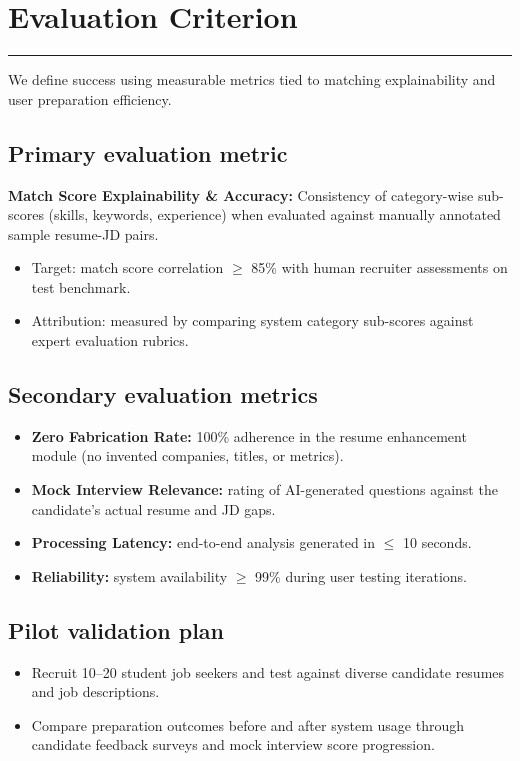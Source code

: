 \documentclass[11pt,a4paper]{article}
\newcommand{\BvrSectionRule}{%
  \par\nobreak\vspace{0.25em}%
  \noindent\rule{\linewidth}{0.4pt}%
  \par\nobreak\vspace{0.4em}%
}
\begin{document}
\section{Evaluation Criterion %
}
\BvrSectionRule
We define success using measurable metrics tied to matching
explainability and user preparation efficiency.

\subsection{Primary evaluation metric}
\textbf{Match Score Explainability \& Accuracy:} Consistency
of category-wise sub-scores (skills, keywords, experience)
when evaluated against manually annotated sample resume-JD
pairs.
\begin{itemize}[leftmargin=0.7cm]
    \item Target: match score correlation $\ge$ 85\% with human recruiter assessments on test benchmark.
    \item Attribution: measured by comparing system category sub-scores against expert evaluation rubrics.
\end{itemize}

\subsection{Secondary evaluation metrics}
\begin{itemize}[leftmargin=0.7cm]
    \item \textbf{Zero Fabrication Rate:} 100\% adherence in the resume enhancement module (no invented companies, titles, or metrics).
    \item \textbf{Mock Interview Relevance:} rating of AI-generated questions against the candidate's actual resume and JD gaps.
    \item \textbf{Processing Latency:} end-to-end analysis generated in $\le$ 10 seconds.
    \item \textbf{Reliability:} system availability $\ge$ 99\% during user testing iterations.
\end{itemize}

\subsection{Pilot validation plan %
}
\begin{itemize}[leftmargin=0.7cm]
    \item Recruit 10--20 student job seekers and test against diverse candidate resumes and job descriptions.
    \item Compare preparation outcomes before and after system usage through candidate feedback surveys and mock interview score progression.
\end{itemize}
\end{document}
